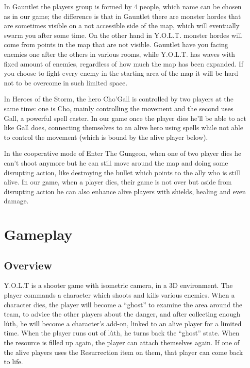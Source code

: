 \documentclass[12pt]{article}
\begin{document}
In Gauntlet the players group is formed by 4 people, which name can be chosen as in our game; the difference is that in Gauntlet there are monster hordes that are sometimes visible on a not accessible side of the map, which will eventually swarm you after some time. On the other hand in Y.O.L.T. monster hordes will come from points in the map that are not visible. Gauntlet have you facing enemies one after the others in various rooms, while Y.O.L.T. has waves with fixed amount of enemies, regardless of how much the map has been expanded. If you choose to fight every enemy in the starting area of the map it will be hard not to be overcome in such limited space. 

In Heroes of the Storm, the hero Cho’Gall is controlled by two players at the same time: one is Cho, mainly controlling the movement and the second uses Gall, a powerful spell caster. In our game once the player dies he’ll be able to act like Gall does, connecting themselves to an alive hero using spells while not able to control the movement (which is bound by the alive player below).

In the cooperative mode of Enter The Gungeon, when one of two player dies he can’t shoot anymore but he can still move around the map and doing some disrupting action, like destroying the bullet which points to the ally who is still alive. In our game, when a player dies, their game is not over but aside from disrupting action he can also enhance alive players with shields, healing and even damage.

\newpage

\section{Gameplay}

\subsection{Overview}

Y.O.L.T is a shooter game with isometric camera, in a 3D environment. The player commands a character which shoots and kills various enemies. When a character dies, the player will become a “ghost” to examine the area around the team, to advice the other players about the danger, and after collecting enough lùth, he will become a character’s add-on, linked to an alive player for a limited time. When the player runs out of lùth, he turns back the “ghost” state. When the resource is filled up again, the player can attach themselves again. If one of the alive players uses the Resurrection item on them, that player can come back to life.
\end{document}
